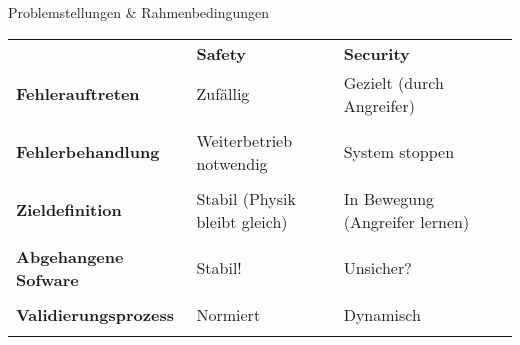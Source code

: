 \begin{frame}[T]{Problemstellungen \& Rahmenbedingungen}
\small

	\begin{table}[]
	\begin{tabular}{lllll}
                               & \textbf{Safety}              & \textbf{Security}              \\[1.4em]

  \arrayrulecolor{lightgray}
  \textbf{Fehlerauftreten}     & Zufällig                     & Gezielt (durch Angreifer)      \\[0.35em]
  \midrule                                                                                     \\[-0.75em]
	\textbf{Fehlerbehandlung}    & Weiterbetrieb notwendig      & System stoppen                 \\[0.35em]
  \midrule                                                                                     \\[-0.75em]
  \textbf{Zieldefinition}      & Stabil (Physik bleibt gleich) & In Bewegung (Angreifer lernen)  \\[0.35em]
  \midrule                                                                                     \\[-0.75em]
	\textbf{Abgehangene Sofware} & Stabil!                      & Unsicher?                      \\[0.35em]
  \midrule                                                                                     \\[-0.75em]
	\textbf{Validierungsprozess} & Normiert                     & Dynamisch                      \\
	                             &                              &
	\end{tabular}
	\end{table}


\end{frame}
